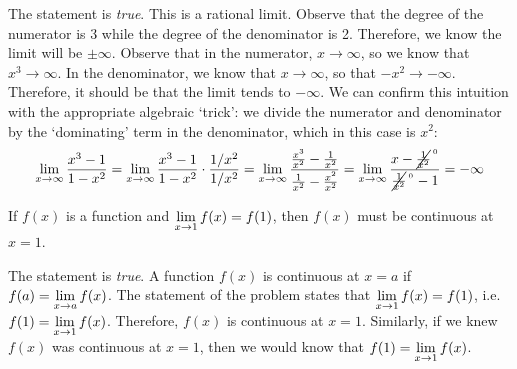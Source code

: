 \documentclass[11pt,letterpaper]{article}
\begin{document}
\sol The statement is \textit{true}. This is a rational limit. Observe that the degree of the numerator is 3 while the degree of the denominator is 2. Therefore, we know the limit will be $\pm\infty$. Observe that in the numerator, $x \to \infty$, so we know that $x^3 \to \infty$. In the denominator, we know that $x \to \infty$, so that $-x^2 \to -\infty$. Therefore, it should be that the limit tends to $-\infty$. We can confirm this intuition with the appropriate algebraic `trick': we divide the numerator and denominator by the `dominating' term in the denominator, which in this case is $x^2$:
	\[
	\lim_{x \to \infty} \dfrac{x^3 - 1}{1 - x^2}= \lim_{x \to \infty} \dfrac{x^3 - 1}{1 - x^2} \cdot \dfrac{1/x^2}{1/x^2}= \lim_{x \to \infty} \dfrac{\tfrac{x^3}{x^2} - \tfrac{1}{x^2}}{\tfrac{1}{x^2} - \tfrac{x^2}{x^2}}= \lim_{x \to \infty} \dfrac{x - \cancel{\tfrac{1}{x^2}}^{\,{}^0}}{\cancel{\tfrac{1}{x^2}}^{\,{}^0} - 1}= -\infty
	\] \pvspace{1.3cm}



 If $f(x)$ is a function and $\displaystyle\lim_{x \to 1} f(x) = f(1)$, then $f(x)$ must be continuous at $x= 1$. \pspace

\sol The statement is \textit{true}. A function $f(x)$ is continuous at $x= a$ if $\displaystyle f(a)= \lim_{x \to a} f(x)$. The statement of the problem states that $\displaystyle\lim_{x \to 1} f(x)= f(1)$, i.e. $\displaystyle f(1)= \lim_{x \to 1} f(x)$. Therefore, $f(x)$ is continuous at $x= 1$. Similarly, if we knew $f(x)$ was continuous at $x= 1$, then we would know that $\displaystyle f(1)= \lim_{x \to 1} f(x)$. \pvspace{1.3cm}
\end{document}
